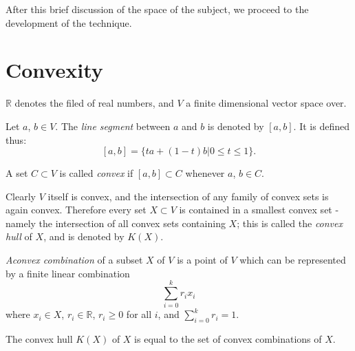 After this brief discussion of the space of the subject, we proceed to the development of the technique.

\section{Convexity}\label{chap1-sec1.2}

$\mathbb{R}$ denotes the filed of real numbers, and $V$ a finite dimensional vector space over.

Let $a$, $b\in V$. The {\em line segment} between $a$ and $b$ is denoted by $[a,b]$. It is defined thus:
$$
[a,b]=\{ta+(1-t)b|0\leq t\leq 1\}.
$$

A set $C\subset V$ is called {\em convex} if $[a,b]\subset C$ whenever $a$, $b\in C$.

Clearly $V$ itself is convex, and the intersection of any family of convex sets is again convex. Therefore every set $X\subset V$ is contained in a smallest convex set - namely the intersection of all convex sets containing $X$; this is called the {\em convex hull} of $X$, and is denoted by $K(X)$.

\begin{definition}\label{chap1-defi1.2.1}
{\em A\pageoriginale convex combination} of a subset $X$ of $V$ is a point of $V$ which can be represented by a finite linear combination
$$
\sum^{k}_{i=0}r_{i}x_{i}
$$
where $x_{i}\in X$, $r_{i}\in \mathbb{R}$, $r_{i}\geq 0$ for all $i$, and $\sum\limits^{k}_{i=0}r_{i}=1$.
\end{definition}

\begin{proposition}\label{chap1-prop1.2.2}
The convex hull $K(X)$ of $X$ is equal to the set of convex combinations of $X$. 
\end{proposition}

